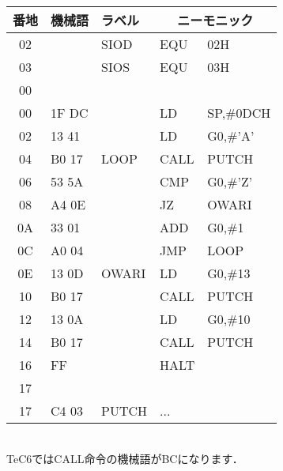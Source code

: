 \begin{center}
{{\begin{description}
\begin{center}
{\footnotesize\tt
\begin{tabular}{|c|l|l|l l|} \hline
番地 & 機械語 & ラベル & \multicolumn{2}{|c|}{ニーモニック} \\
\hline
02 &       & SIOD  & EQU  & 02H             \\
03 &       & SIOS  & EQU  & 03H             \\
00 &       &       &      &                 \\
00 & 1F DC &       & LD   & SP,\#0DCH       \\
02 & 13 41 &       & LD   & G0,\#'A'        \\
04 & B0 17 & LOOP  & CALL & PUTCH           \\
06 & 53 5A &       & CMP  & G0,\#'Z'        \\
08 & A4 0E &       & JZ   & OWARI           \\
0A & 33 01 &       & ADD  & G0,\#1          \\
0C & A0 04 &       & JMP  & LOOP            \\
0E & 13 0D & OWARI & LD   & G0,\#13         \\
10 & B0 17 &       & CALL & PUTCH           \\
12 & 13 0A &       & LD   & G0,\#10         \\
14 & B0 17 &       & CALL & PUTCH           \\
16 & FF    &       & HALT &                 \\
17 &       &       &      &                 \\
17 & C4 03 & PUTCH & ...   &                \\
\hline
\end{tabular}
\\TeC6ではCALL命令の機械語がBCになります．
}
\end{center}
\end{description}
}}
\end{center}

